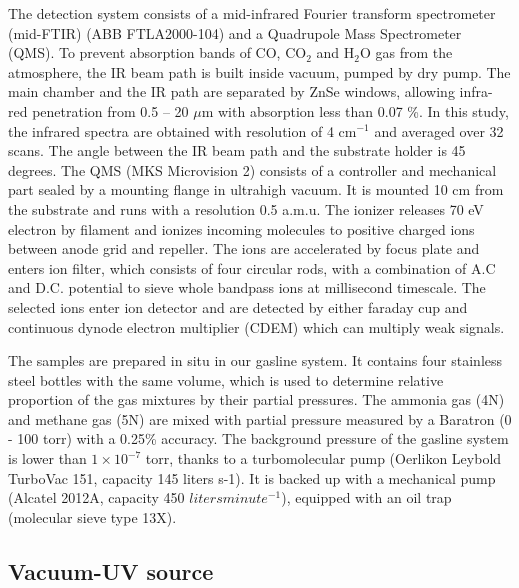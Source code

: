 The detection system consists of a mid-infrared Fourier transform spectrometer (mid-FTIR) (ABB FTLA2000-104) and a Quadrupole Mass Spectrometer (QMS). To prevent absorption bands of CO, CO$_2$ and H$_2$O gas from the atmosphere, the IR beam path is built inside vacuum, pumped by dry pump. The main chamber and the IR path are separated by ZnSe windows, allowing infra-red penetration from 0.5 – 20 $\mu$m with absorption less than 0.07 \%. In this study, the infrared spectra are obtained with resolution of 4 cm$^{-1}$ and averaged over 32 scans. The angle between the IR beam path and the substrate holder is 45 degrees. The QMS (MKS Microvision 2) consists of a controller and mechanical part sealed by a mounting flange in ultrahigh vacuum. It is mounted 10 cm from the substrate and runs with a resolution 0.5 a.m.u. The ionizer releases 70 eV electron by filament and ionizes incoming molecules to positive charged ions between anode grid and repeller. The ions are accelerated by focus plate and enters ion filter, which consists of four circular rods, with a combination of A.C and D.C. potential to sieve whole bandpass ions at millisecond timescale. The selected ions enter ion detector and are detected by either faraday cup and continuous dynode electron multiplier (CDEM) which can multiply weak signals.

The samples are prepared in situ in our gasline system. It contains four stainless steel bottles with the same volume, which is used to determine relative proportion of the gas mixtures by their partial pressures. The ammonia gas (4N) and methane gas (5N) are mixed with partial pressure measured by a Baratron (0 - 100 torr) with a 0.25\% accuracy. The background pressure of the gasline system is lower than $1 \times 10^{-7}$ torr, thanks to a turbomolecular pump (Oerlikon Leybold TurboVac 151, capacity 145 liters s-1). It is backed up with a mechanical pump (Alcatel 2012A, capacity 450 $liters minute^{-1}$), equipped with an oil trap (molecular sieve type 13X).

\subsection{Vacuum-UV source}
\label{sec:Vacuum_UV_source}

